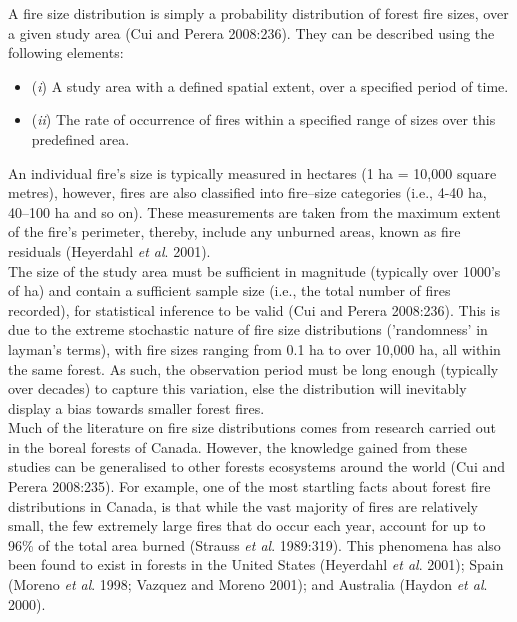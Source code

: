 \begin{spacing}{1.5}
\noindent A fire size distribution is simply a probability distribution of forest fire sizes, over a given study area (Cui and Perera 2008:236). They can be described using the following elements:

\begin{itemize}
\item{(\emph{i})} A study area with a defined spatial extent, over a specified period of time.
\item{(\emph{ii})} The rate of occurrence of fires within a specified range of sizes over this predefined area.
\end{itemize}

\noindent An individual fire's size is typically measured in hectares (1 ha = 10,000 square metres), however, fires are also classified into fire--size categories (i.e., 4-40 ha, 40--100 ha and so on). These measurements are taken from the maximum extent of the fire's perimeter, thereby, include any unburned areas, known as fire residuals (Heyerdahl \emph{et al}. 2001). \\

\noindent The size of the study area must be sufficient in magnitude (typically over 1000's of ha) and contain a sufficient sample size (i.e., the total number of fires recorded), for statistical inference to be valid (Cui and Perera 2008:236). This is due to the extreme stochastic nature of fire size distributions ('randomness' in layman's terms), with fire sizes ranging from 0.1 ha to over 10,000 ha, all within the same forest. As such, the observation period must be long enough (typically over decades) to capture this variation, else the distribution will inevitably display a bias towards smaller forest fires. \\

\noindent Much of the literature on fire size distributions comes from research carried out in the boreal forests of Canada. However, the knowledge gained from these studies can be generalised to other forests ecosystems around the world (Cui and Perera 2008:235). For example, one of the most startling facts about forest fire distributions in Canada, is that while the vast majority of fires are relatively small, the few extremely large fires that do occur each year, account for up to 96\% of the total area burned (Strauss \emph{et al}. 1989:319). This phenomena has also been found to exist in forests in the United States (Heyerdahl \emph{et al}. 2001); Spain (Moreno \emph{et al}. 1998; Vazquez and Moreno 2001); and Australia (Haydon \emph{et al}. 2000).


\end{spacing}

